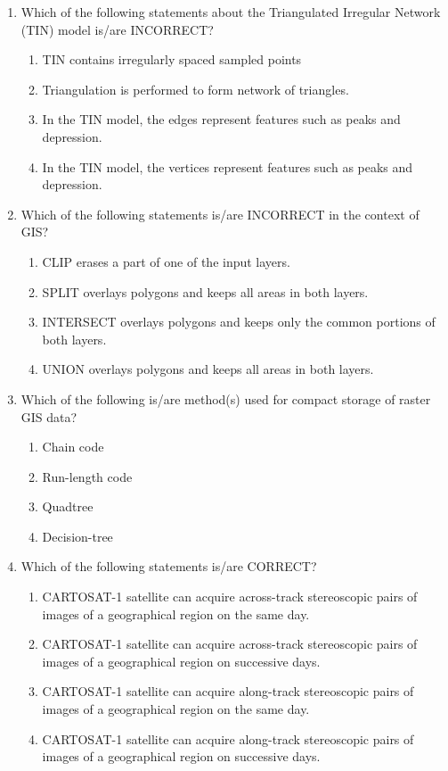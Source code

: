 \documentclass[12pt]{article}
\begin{document}
\begin{enumerate}
\item Which of the following statements about the Triangulated Irregular Network
(TIN) model is/are INCORRECT?
\begin{enumerate}
    \item TIN contains irregularly spaced sampled points 
   \item Triangulation is performed to form network of triangles. 
   \item In the TIN model, the edges represent features such as peaks and depression. 
   \item In the TIN model, the vertices represent features such as peaks and depression.
\end{enumerate}

\item  Which of the following statements is/are INCORRECT in the context of GIS? 

\begin{enumerate}
    \item CLIP erases a part of one of the input layers. 
   \item SPLIT overlays polygons and keeps all areas in both layers. 
   \item INTERSECT overlays polygons and keeps only the common portions of both layers. 
   \item UNION overlays polygons and keeps all areas in both layers.
\end{enumerate}

\item Which of the following is/are method(s) used for compact storage of raster GIS
data?
\begin{enumerate}
    \item Chain code 
   \item Run-length code 
   \item Quadtree 
   \item Decision-tree
\end{enumerate}

\item Which of the following statements is/are CORRECT?
 \begin{enumerate}
     \item CARTOSAT-1 satellite can acquire across-track stereoscopic pairs of images of a
geographical region on the same day. 
   \item CARTOSAT-1 satellite can acquire across-track stereoscopic pairs of images of a
geographical region on successive days. 
   \item CARTOSAT-1 satellite can acquire along-track stereoscopic pairs of images of a
geographical region on the same day. 
   \item CARTOSAT-1 satellite can acquire along-track stereoscopic pairs of images of a
geographical region on successive days.
 \end{enumerate}




\end{enumerate}
\end{document}
